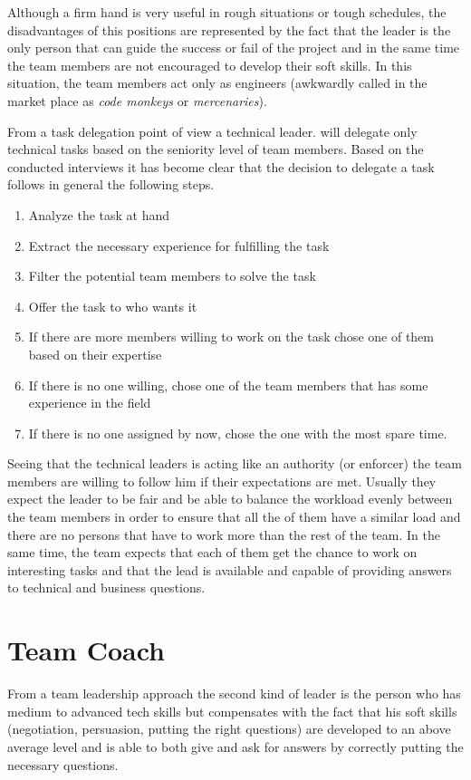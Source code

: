 Although a firm hand is very useful in rough situations or tough schedules, the disadvantages of this positions are represented by the fact that the leader is the only person that can guide the success or fail of the project and in the same time the team members are not encouraged to develop their soft skills. In this situation, the team members act only as engineers (awkwardly called in the market place as \textit{code monkeys} or \textit{mercenaries}).

From a task delegation point of view a technical leader. will delegate only technical tasks based on the seniority level of team members. Based on the conducted interviews it has become clear that the decision to delegate a task follows in general the following steps.
\begin{enumerate}
\item Analyze the task at hand
\item Extract the necessary experience for fulfilling the task
\item Filter the potential team members to solve the task
\item Offer the task to who wants it
\item If there are more members willing to work on the task chose one of them based on their expertise
\item If there is no one willing, chose one of the team members that has some experience in the field
\item If there is no one assigned by now, chose the one with the most spare time.
\end{enumerate}

Seeing that the technical leaders is acting like an authority (or enforcer) the team members are willing to follow him if their expectations are met. Usually they expect the leader to be fair and be able to balance the workload evenly between the team members in order to ensure that all the of them have a similar load and there are no persons that have to work more than the rest of the team. In the same time, the team expects that each of them get the chance to work on interesting tasks and that the lead is available and capable of providing answers to technical and business questions.

\section{Team Coach}
\label{sec:team-coach}
From a team leadership approach the second kind of leader is the person who has medium to advanced tech skills but compensates with the fact that his soft skills (negotiation, persuasion, putting the right questions) are developed to an above average level and  is able to both give and ask for answers by correctly putting the necessary questions.


